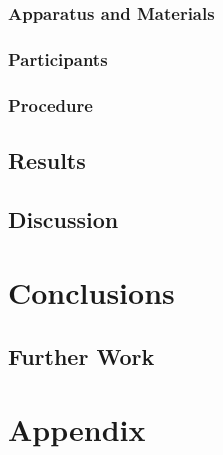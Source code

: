 \documentclass[journal]{IEEEtran}
\begin{document}
\subsubsection{Apparatus and Materials}
\subsubsection{Participants}
\subsubsection{Procedure}
\subsection{Results}
\subsection{Discussion}
\section{Conclusions}
\subsection{Further Work}


\section{Appendix}
\end{document}
